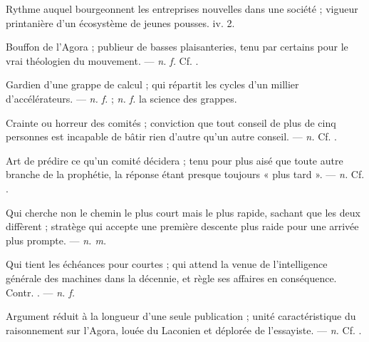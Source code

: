  Rythme auquel bourgeonnent les entreprises nouvelles dans une société ; vigueur printanière d'un écosystème de jeunes pousses.   iv. 2.

 Bouffon de l'Agora ; publieur de basses plaisanteries, tenu par certains pour le vrai théologien du mouvement.  ---  \textit{n. f.} Cf. .

 Gardien d'une grappe de calcul ; qui répartit les cycles d'un millier d'accélérateurs.   ---  \textit{n. f.} ;  \textit{n. f.} la science des grappes.

 Crainte ou horreur des comités ; conviction que tout conseil de plus de cinq personnes est incapable de bâtir rien d'autre qu'un autre conseil. ---  \textit{n.} Cf. .

 Art de prédire ce qu'un comité décidera ; tenu pour plus aisé que toute autre branche de la prophétie, la réponse étant presque toujours « plus tard ». ---  \textit{n.} Cf. .

 Qui cherche non le chemin le plus court mais le plus rapide, sachant que les deux diffèrent ; stratège qui accepte une première descente plus raide pour une arrivée plus prompte. ---  \textit{n. m.}

 Qui tient les échéances pour courtes ; qui attend la venue de l'intelligence générale des machines dans la décennie, et règle ses affaires en conséquence. Contr. . ---  \textit{n. f.}

 Argument réduit à la longueur d'une seule publication ; unité caractéristique du raisonnement sur l'Agora, louée du Laconien et déplorée de l'essayiste. ---  \textit{n.} Cf. .

